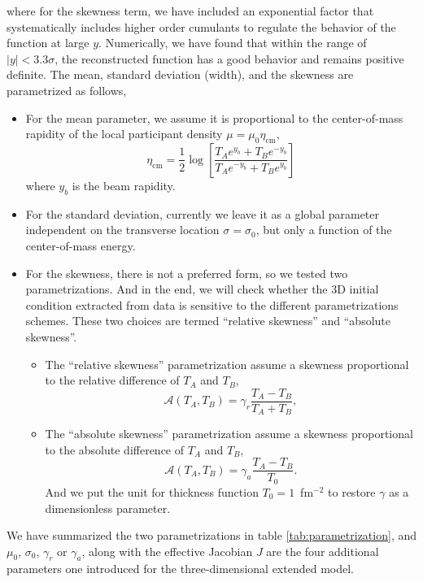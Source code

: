 where for the skewness term, we have included an exponential factor that systematically includes higher order cumulants to regulate the behavior of the function at large $y$.
Numerically, we have found that within the range of $|y| < 3.3\sigma$, the reconstructed function has a good behavior and remains positive definite.
The mean, standard deviation (width), and the skewness are parametrized as follows,
\begin{itemize}
\item For the mean parameter, we assume it is proportional to the center-of-mass rapidity of the local participant density $\mu = \mu_0\eta_\text{cm}$,
\begin{equation}
  \eta_\text{cm}=\frac{1}{2} \log \left[\frac{T_A e^{y_b}+T_Be^{-y_b}}{T_A e^{-y_b}+T_B e^{y_b}}\right]
\end{equation}
where $y_b$ is the beam rapidity.
\item For the standard deviation, currently we leave it as a global parameter independent on the transverse location $\sigma = \sigma_0$, but only a function of the center-of-mass energy.
\item For the skewness, there is not a preferred form, so we tested two parametrizations. 
And in the end, we will check whether the 3D initial condition extracted from data is sensitive to the different parametrizations schemes.
These two choices are termed ``relative skewness'' and ``absolute skewness''.
\begin{itemize}
\item The ``relative skewness'' parametrization assume a skewness proportional to the relative difference of $T_A$ and $T_B$,
\begin{equation}
  \mathcal{A}(T_A, T_B) = \gamma_r\frac{T_A - T_B}{T_A + T_B},
\end{equation}
\item The ``absolute skewness'' parametrization assume a skewness proportional to the absolute difference of $T_A$ and $T_B$,
\begin{equation}
  \mathcal{A}(T_A, T_B) = \gamma_a \frac{T_A - T_B}{T_0}.
\end{equation}
And we put the unit for thickness function $T_0=1$~fm$^{-2}$ to restore $\gamma$ as a dimensionless parameter.
\end{itemize}
\end{itemize}
We have summarized the two parametrizations in table \ref{tab:parametrization}, and $\mu_0$, $\sigma_0$, $\gamma_r$ or $\gamma_a$, along with the effective Jacobian $J$ are the four additional parameters one introduced for the three-dimensional extended \trento model.
